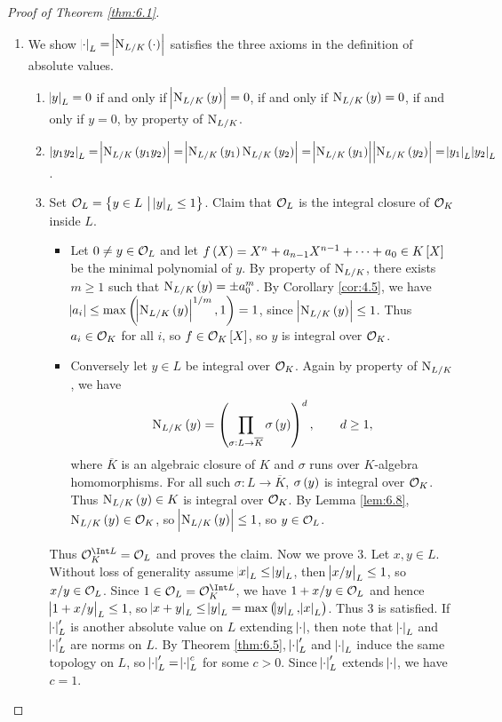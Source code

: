 \begin{proof}[Proof of Theorem \ref{thm:6.1}]
\hfill
\begin{enumerate}
\item We show $ \abs{\cdot}_L = \abs{\N_{L / K}\br{\cdot}} $ satisfies the three axioms in the definition of absolute values.
\begin{enumerate}[label=\arabic*.]
\item $ \abs{y}_L = 0 $ if and only if $ \abs{\N_{L / K}\br{y}} = 0 $, if and only if $ \N_{L / K}\br{y} = 0 $, if and only if $ y = 0 $, by property of $ \mathrm{N}_{L / K} $.
\item $ \abs{y_1y_2}_L = \abs{\N_{L / K}\br{y_1y_2}} = \abs{\N_{L / K}\br{y_1}\N_{L / K}\br{y_2}} = \abs{\N_{L / K}\br{y_1}}\abs{\N_{L / K}\br{y_2}} = \abs{y_1}_L\abs{y_2}_L $.
\item Set $ \OOO_L = \cbr{y \in L \st \abs{y}_L \le 1} $. Claim that $ \mathcal{O}_L $ is the integral closure of $ \mathcal{O}_K $ inside $ L $.
\begin{itemize}
\item Let $ 0 \ne y \in \mathcal{O}_L $ and let $ f\br{X} = X^n + a_{n - 1}X^{n - 1} + \dots + a_0 \in K\sbr{X} $ be the minimal polynomial of $ y $. By property of $ \mathrm{N}_{L / K} $, there exists $ m \ge 1 $ such that $ \N_{L / K}\br{y} = \pm a_0^m $. By Corollary \ref{cor:4.5}, we have $ \abs{a_i} \le \max\br{\abs{\N_{L / K}\br{y}}^{1 / m}, 1} = 1 $, since $ \abs{\N_{L / K}\br{y}} \le 1 $. Thus $ a_i \in \mathcal{O}_K $ for all $ i $, so $ f \in \OOO_K\sbr{X} $, so $ y $ is integral over $ \mathcal{O}_K $.
\item Conversely let $ y \in L $ be integral over $ \mathcal{O}_K $. Again by property of $ \mathrm{N}_{L / K} $, we have
$$ \N_{L / K}\br{y} = \br{\prod_{\sigma : L \to \overline{K}} \sigma\br{y}}^d, \qquad d \ge 1, $$
where $ \overline{K} $ is an algebraic closure of $ K $ and $ \sigma $ runs over $ K $-algebra homomorphisms. For all such $ \sigma : L \to \overline{K} $, $ \sigma\br{y} $ is integral over $ \mathcal{O}_K $. Thus $ \N_{L / K}\br{y} \in K $ is integral over $ \mathcal{O}_K $. By Lemma \ref{lem:6.8}, $ \N_{L / K}\br{y} \in \OOO_K $, so $ \abs{\N_{L / K}\br{y}} \le 1 $, so $ y \in \mathcal{O}_L $.
\end{itemize}
Thus $ \OOO_K^{\Int L} = \OOO_L $ and proves the claim. Now we prove $ 3 $. Let $ x, y \in L $. Without loss of generality assume $ \abs{x}_L \le \abs{y}_L $, then $ \abs{x / y}_L \le 1 $, so $ x / y \in \mathcal{O}_L $. Since $ 1 \in \OOO_L = \OOO_K^{\Int L} $, we have $ 1 + x / y \in \mathcal{O}_L $ and hence $ \abs{1 + x / y}_L \le 1 $, so $ \abs{x + y}_L \le \abs{y}_L = \max\br{\abs{y}_L, \abs{x}_L} $. Thus $ 3 $ is satisfied. If $ \abs{\cdot}_L' $ is another absolute value on $ L $ extending $ \abs{\cdot} $, then note that $ \abs{\cdot}_L $ and $ \abs{\cdot}_L' $ are norms on $ L $. By Theorem \ref{thm:6.5}, $ \abs{\cdot}_L' $ and $ \abs{\cdot}_L $ induce the same topology on $ L $, so $ \abs{\cdot}_L' = \abs{\cdot}_L^c $ for some $ c > 0 $. Since $ \abs{\cdot}_L' $ extends $ \abs{\cdot} $, we have $ c = 1 $.

\end{enumerate}
\end{enumerate}
\end{proof}
